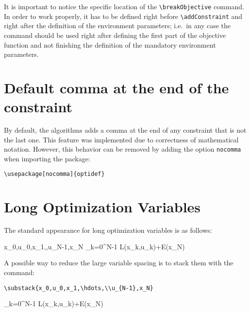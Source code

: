 \documentclass[a4paper]{article}
\begin{document}
It is important to notice the specific location of the \verb|\breakObjective| command. In order to work properly, it has to be defined right before \verb|\addConstraint| and right after the definition of the environment parameters; i.e.~in any case the command should be used right after defining the first part of the objective function and not finishing the definition of the mandatory environment parameters.

\section{Default comma at the end of the constraint}
\label{sec:comma}
By default, the algorithms adds a comma at the end of any constraint that is not the last one. This feature was implemented due to correctness of mathematical notation. However, this behavior can be removed by adding the option \verb|nocomma| when importing the package:

\begin{lstlisting}
\usepackage[nocomma]{optidef}
\end{lstlisting}



\section{Long Optimization Variables}
The standard appearance for long optimization variables is as follows:

\begin{mini!}
	{x_0,u_0,x_1,\hdots,u_{N-1},x_N}
	{\sum_{k=0}^{N-1} L(x_k,u_k)\!\!+\!\!E(x_N)\label{OCPobj}}
	{\label{eq:OCP}}{}
\end{mini!}

\noindent A possible way to reduce the large variable spacing is to stack them with the command: \begin{verbatim}
\substack{x_0,u_0,x_1,\hdots,\\u_{N-1},x_N}
\end{verbatim}

\begin{mini!}
	{}
	{\sum_{k=0}^{N-1} L(x_k,u_k)\!\!+\!\!E(x_N)\label{OCPobj}}
	{\label{eq:OCP}}{}
\end{mini!}
\end{document}
